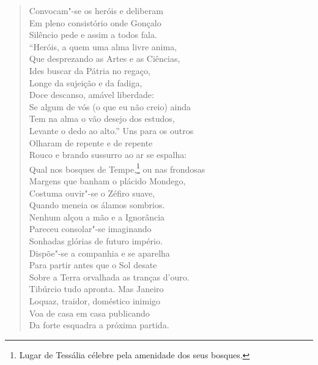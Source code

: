 \begin{verse}
Convocam"-se os heróis e deliberam\\
Em pleno consistório onde Gonçalo\\
Silêncio pede e assim a todos fala.\\
``Heróis, a quem uma alma livre anima,\\
Que desprezando as Artes e as Ciências,\\
Ides buscar da Pátria no regaço,\\
Longe da sujeição e da fadiga,\\
Doce descanso, amável liberdade:\\
Se algum de vós (o que eu não creio) ainda\\
Tem na alma o vão desejo dos estudos,\\
Levante o dedo ao alto.'' Uns para os outros\\ 
Olharam de repente e de repente\\
Rouco e brando sussurro ao ar se espalha:\\
Qual nos bosques de Tempe,\footnote{ Lugar de Tessália célebre pela
amenidade dos seus bosques.} ou nas \qb{}frondosas\\
Margens que banham o plácido Mondego,\\			\index{\Monde}
Costuma ouvir"-se o Zéfiro suave,\\		\index{\Zefir}
Quando meneia os álamos sombrios.\\
Nenhum alçou a mão e a Ignorância\\			\index{\Ignor}
Pareceu consolar"-se imaginando\\
Sonhadas glórias de futuro império. \\[10pt]


Dispõe"-se a companhia e se aparelha\\
Para partir antes que o Sol desate\\
Sobre a Terra orvalhada as tranças d'ouro.\\
Tibúrcio tudo apronta. Mas Janeiro\\ 		\index{\Jane}
Loquaz, traidor, doméstico inimigo\\
Voa de casa em casa publicando\\
Da forte esquadra a próxima partida. \\[10pt]



\end{verse}
